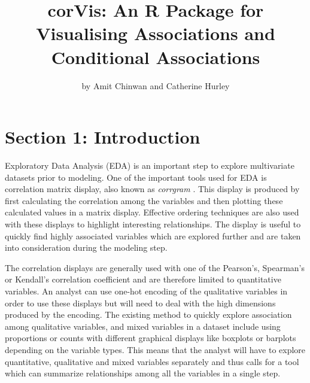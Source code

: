 \title{corVis: An R Package for Visualising Associations and Conditional
Associations}
\author{by Amit Chinwan and Catherine Hurley}

\maketitle


\hypertarget{section-1-introduction}{%
\section{Section 1: Introduction}\label{section-1-introduction}}

Exploratory Data Analysis (EDA) is an important step to explore
multivariate datasets prior to modeling. One of the important tools used
for EDA is correlation matrix display, also known as \emph{corrgram}
\citep{friendly2002corrgrams}. This display is produced by first
calculating the correlation among the variables and then plotting these
calculated values in a matrix display. Effective ordering techniques are
also used with these displays to highlight interesting relationships.
The display is useful to quickly find highly associated variables which
are explored further and are taken into consideration during the
modeling step.

The correlation displays are generally used with one of the Pearson's,
Spearman's or Kendall's correlation coefficient and are therefore
limited to quantitative variables. An analyst can use one-hot encoding
of the qualitative variables in order to use these displays but will
need to deal with the high dimensions produced by the encoding. The
existing method to quickly explore association among qualitative
variables, and mixed variables in a dataset include using proportions or
counts with different graphical displays like boxplots or barplots
depending on the variable types. This means that the analyst will have
to explore quantitative, qualitative and mixed variables separately and
thus calls for a tool which can summarize relationships among all the
variables in a single step.

